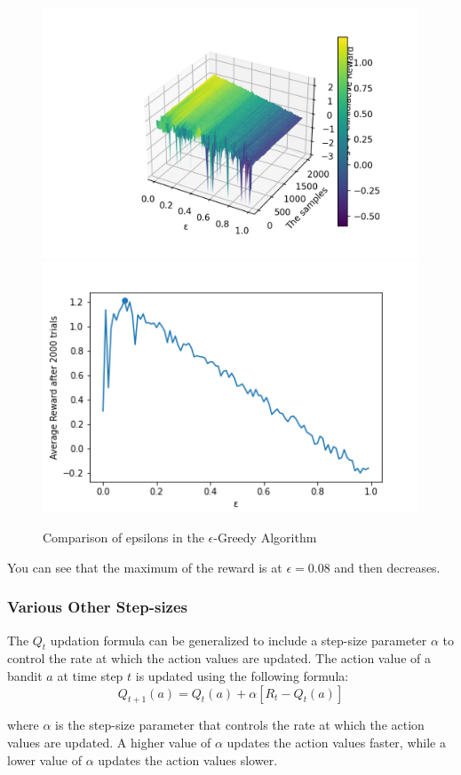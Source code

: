 \begin{figure}[h!]
    \centering
    \includegraphics[width=0.49\linewidth]{images/3d-compare-epsilon-greedy.png}
    \includegraphics[width=0.49\linewidth]{images/compare-epsilons-greedy.png}
    \caption{Comparison of epsilons in the $\epsilon$-Greedy Algorithm}
    \label{fig:epsilon_greedy_optimistic}
\end{figure}

You can see that the maximum of the reward is at $\epsilon=0.08$ and then decreases.

\subsubsection{Various Other Step-sizes}

The $Q_t$ updation formula can be generalized to include a step-size parameter $\alpha$ to control the rate at which the action values are updated. The action value of a bandit $a$ at time step $t$ is updated using the following formula:
\[Q_{t+1}(a) = Q_t(a) + \alpha[R_t - Q_t(a)]\]

where $\alpha$ is the step-size parameter that controls the rate at which the action values are updated. A higher value of $\alpha$ updates the action values faster, while a lower value of $\alpha$ updates the action values slower.